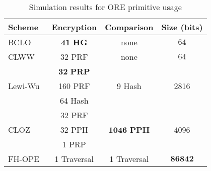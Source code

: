 \begin{table}[t]
	\centering
	\caption{Simulation results for ORE primitive usage}\label{tbl:primitive-usage-result}
	\begin{tabular}{ l c c c }

		\toprule

		Scheme										& Encryption				& Comparison								& Size (bits)			\\

		\toprule

		BCLO~\cite{bclo-ope}					& $\bm{41}$ \textbf{HG}		& none										& $64$					\\

		\midrule

		CLWW~\cite{clww-ore}					& 32 PRF 					& none										& $64$					\\

		\midrule

		\multirow{3}{*}{Lewi-Wu~\cite{lewi-wu-ore}}	& $\bm{32}$ \textbf{PRP}	& \multirow{3}{*}{9 Hash}					& \multirow{3}{*}{2816}	\\
													& 160 PRF					&											&						\\
													& 64 Hash					&											&						\\

		\midrule

		\multirow{3}{*}{CLOZ~\cite{parameter-hiding-ore}}	& 32 PRF					& \multirow{3}{*}{$\bm{1046}$ \textbf{PPH}}	& \multirow{3}{*}{4096}	\\
													& 32 PPH					&											&						\\
													& 1 PRP						&											&						\\

		\midrule

		FH-OPE~\cite{fh-ope}						& 1 Traversal 				& 1 Traversal								& $\bm{86842}$			 \\

		\bottomrule

	\end{tabular}
\end{table}
